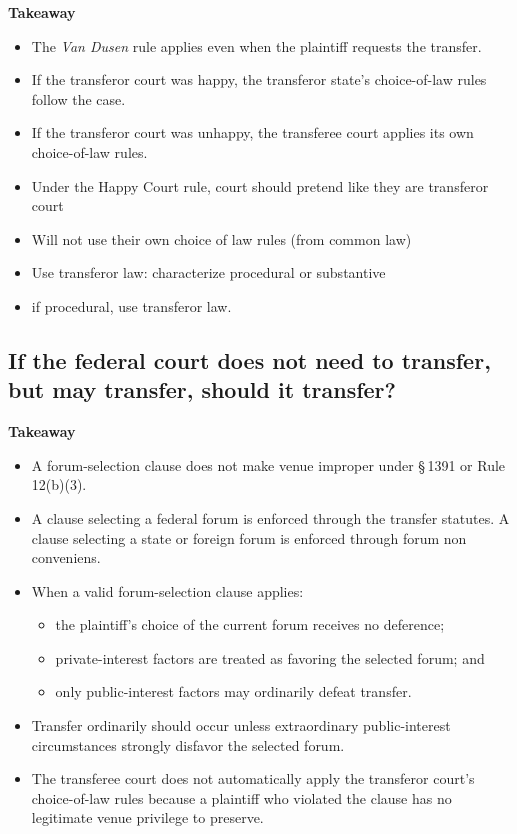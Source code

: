 \documentclass[11pt]{tex/lawoutline}
\begin{document}
{
\textbf{Takeaway}
\begin{itemize}
    \item The \textit{Van Dusen} rule applies even when the plaintiff requests the transfer.
    \item If the transferor court was happy, the transferor state's choice-of-law rules follow the case.
    \item If the transferor court was unhappy, the transferee court applies its own choice-of-law rules.
\end{itemize}
}


{
\begin{itemize}
    \item Under the Happy Court rule, court should pretend like they are transferor court
    \item Will not use their own choice of law rules (from common law)
    \item Use transferor law: characterize procedural or substantive
    \item if procedural, use transferor law. 
\end{itemize}
}

\subsection{If the federal court does not need to transfer, but may transfer, should it transfer?}

{
\textbf{Takeaway}
\begin{itemize}
    \item A forum-selection clause does not make venue improper under \S\,1391 or Rule 12(b)(3).
    \item A clause selecting a federal forum is enforced through the transfer statutes. A clause selecting a state or foreign forum is enforced through forum non conveniens.
    \item When a valid forum-selection clause applies:
    \begin{itemize}
        \item the plaintiff's choice of the current forum receives no deference;
        \item private-interest factors are treated as favoring the selected forum; and
        \item only public-interest factors may ordinarily defeat transfer.
    \end{itemize}
    \item Transfer ordinarily should occur unless extraordinary public-interest circumstances strongly disfavor the selected forum.
    \item The transferee court does not automatically apply the transferor court's choice-of-law rules because a plaintiff who violated the clause has no legitimate venue privilege to preserve.
\end{itemize}
}
\end{document}
